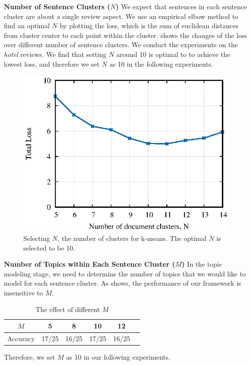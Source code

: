 \textbf{Number of Sentence Clusters ($N$)}
We expect that sentences in each sentence cluster are about a single review aspect.
We use an empirical elbow method to find an optimal $N$ by plotting the loss, which is the sum of euclidean distances from cluster center to each point within the cluster.
 shows the changes of the loss over different number of sentence clusters.
We conduct the experiments on the \textit{hotel} reviews.
We find that setting $N$ around 10 is optimal to to achieve the lowest loss, and therefore we set $N$ as 10 in the following experiments.

\begin{figure}[b]
\centering
\includegraphics[width=0.8\columnwidth]{data/differentn}
\caption{Selecting $N$, the number of clusters for k-means. The optimal
$N$ is selected to be 10.}
\label{fig:differentn}
\end{figure}

\textbf{Number of Topics within Each Sentence Cluster ($M$)}
In the topic modeling stage, we need to determine 
the number of topics that we would like to model 
for each sentence cluster.
As  shows,
the performance of  our framework is insensitive to $M$.
\begin{table}[t]
	\normalsize
	\centering
	\caption{The effect of different $M$ }
	\label{table:differentm}
	\begin{tabular}{|c|c|c|c|c|c|}
		\hline
		$M$ & 5 & 8 & \textbf{10}& 12  \\\hline
		Accuracy & 17/25 & 16/25 & 17/25 &16/25 \\\hline
	\end{tabular}
\end{table}
Therefore, we set $M$ as 10 in our following experiments.


